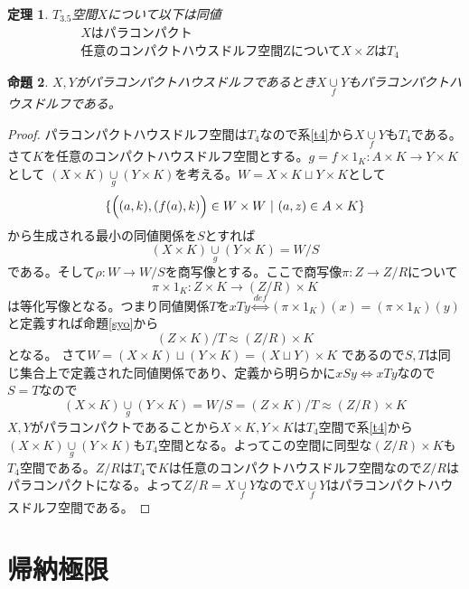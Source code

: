 \documentclass[leqno]{jsarticle}
\newtheorem{thm}{定理}
\newtheorem{prop}[thm]{命題}
\newcommand{\qt}[2]{#1/\! #2}
\newcommand{\main}{X\underset{f}{\cup} Y}
\begin{document}
\begin{thm}
$T_{3.5}$空間$X$について以下は同値
\begin{align}
&\mbox{$X$はパラコンパクト}\\
&\mbox{任意のコンパクトハウスドルフ空間Zについて$X\times Z$は$T_4$}
\end{align}
\end{thm}
\setcounter{equation}{0}
\begin{prop}
$X,Y$がパラコンパクトハウスドルフであるとき$\main$もパラコンパクトハウスドルフである。
\end{prop}
\begin{proof}
パラコンパクトハウスドルフ空間は$T_4$なので系\ref{t4}から$\main$も$T_4$である。さて$K$を任意のコンパクトハウスドルフ空間とする。$g=f\times 1_K:A\times K\to Y\times K$として
$(X\times K)\underset{g}{\cup} (Y\times K)$を考える。$W=X\times K\sqcup Y\times K$として
\[
\{\Bigl((a,k),(f(a),k)\Bigr)\in W\times W\ |\ (a,z)\in A\times K\}
\]
から生成される最小の同値関係を$S$とすれば
\[
(X\times K)\underset{g}{\cup} (Y\times K)=\qt{W}{S}
\]
である。そして$\rho:W\to \qt{W}{S}$を商写像とする。ここで商写像$\pi:Z\to \qt{Z}{R}$について
\[
\pi\times 1_K:Z\times K\to (\qt{Z}{R})\times K
\]
は等化写像となる。つまり同値関係$T$を$xTy\overset{def}{\iff}(\pi\times 1_K)(x)=(\pi\times 1_K)(y)$と定義すれば命題\ref{syo}から
\[
\qt{(Z\times K)}{T}\approx (\qt{Z}{R})\times K
\]
となる。
さて$W=(X\times K)\sqcup (Y\times K)=(X\sqcup Y)\times K$	であるので$S,T$は同じ集合上で定義された同値関係であり、定義から明らかに$xSy\iff xTy$なので$S=T$なので
\[
(X\times K)\underset{g}{\cup} (Y\times K)=\qt{W}{S}=\qt{(Z\times K)}{T}\approx (\qt{Z}{R})\times K
\]$X,Y$がパラコンパクトであることから$X\times K,Y\times K$は$T_4$空間で系\ref{t4}から
$(X\times K)\underset{g}{\cup} (Y\times K)$も$T_4$空間となる。よってこの空間に同型な$(\qt{Z}{R})\times K$も$T_4$空間である。$\qt{Z}{R}$は$T_4$で$K$は任意のコンパクトハウスドルフ空間なので$\qt{Z}{R}$はパラコンパクトになる。よって$\qt{Z}{R}=\main$なので$\main$はパラコンパクトハウスドルフ空間である。
\end{proof}

\section{帰納極限}
\end{document}
